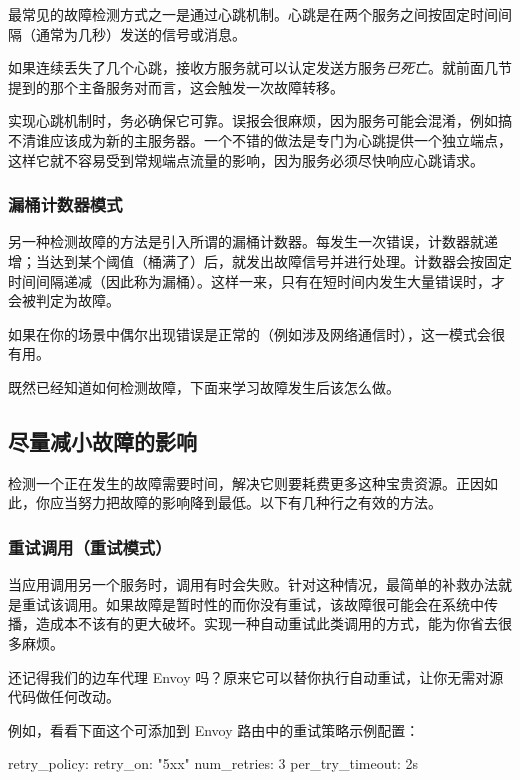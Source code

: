 \label{idx:341}
最常见的故障检测方式之一是通过心跳机制。心跳是在两个服务之间按固定时间间隔（通常为几秒）发送的信号或消息。

\label{idx:342}
如果连续丢失了几个心跳，接收方服务就可以认定发送方服务\emph{已死亡}。就前面几节提到的那个主备服务对而言，这会触发一次故障转移。

实现心跳机制时，务必确保它可靠。误报会很麻烦，因为服务可能会混淆，例如搞不清谁应该成为新的主服务器。一个不错的做法是专门为心跳提供一个独立端点，这样它就不容易受到常规端点流量的影响，因为服务必须尽快响应心跳请求。

\subsubsection{漏桶计数器模式}

\label{idx:343}
\label{idx:344}
另一种检测故障的方法是引入所谓的漏桶计数器。每发生一次错误，计数器就递增；当达到某个阈值（桶满了）后，就发出故障信号并进行处理。计数器会按固定时间间隔递减（因此称为漏桶）。这样一来，只有在短时间内发生大量错误时，才会被判定为故障。

如果在你的场景中偶尔出现错误是正常的（例如涉及网络通信时），这一模式会很有用。

既然已经知道如何检测故障，下面来学习故障发生后该怎么做。

\subsection{尽量减小故障的影响}

\label{idx:345}
检测一个正在发生的故障需要时间，解决它则要耗费更多这种宝贵资源。正因如此，你应当努力把故障的影响降到最低。以下有几种行之有效的方法。

\subsubsection{重试调用（重试模式）}

\label{idx:346}
当应用调用另一个服务时，调用有时会失败。针对这种情况，最简单的补救办法就是重试该调用。如果故障是暂时性的而你没有重试，该故障很可能会在系统中传播，造成本不该有的更大破坏。实现一种自动重试此类调用的方式，能为你省去很多麻烦。

还记得我们的边车代理 Envoy 吗？原来它可以替你执行自动重试，让你无需对源代码做任何改动。

例如，看看下面这个可添加到 Envoy 路由中的重试策略示例配置：

\begin{codebox}[yaml]
retry_policy:
  retry_on: "5xx"
  num_retries: 3
  per_try_timeout: 2s
\end{codebox}

